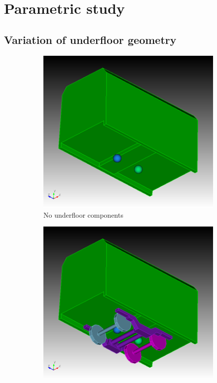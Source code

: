
\section{Parametric study}
\label{section:parametric_study}
\subsection{Variation of underfloor geometry}
\label{section:variation_geometry}

\begin{figure}[H]
	\centering
	\begin{subfigure}[b]{0.49\textwidth}
		\centering
		\includegraphics[width = 0.8\linewidth]{fig/chap4/geometry/no_underfloor_components_2.png}
		\caption{No underfloor components}
	\end{subfigure}
	\begin{subfigure}[b]{0.49\textwidth}
		\centering
		\includegraphics[width = 0.8\linewidth]{fig/chap4/geometry/no_air_suspension_2.png}

\end{subfigure}
\end{figure}
